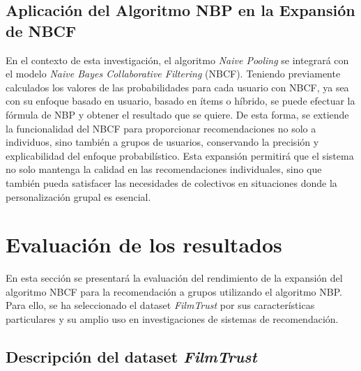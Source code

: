 \documentclass[twocolumn, fontsize=10pt]{article}
\begin{document}
\subsection{Aplicación del Algoritmo NBP en la Expansión de NBCF}

En el contexto de esta investigación, el algoritmo 
\textit{Naive Pooling} se integrará con el modelo 
\textit{Naive Bayes Collaborative Filtering} (NBCF). 
Teniendo previamente calculados los valores de las 
probabilidades para cada usuario con NBCF, ya sea con 
su enfoque basado en usuario, basado en ítems o híbrido,
se puede efectuar la fórmula de NBP y obtener el resultado 
que se quiere. De esta forma, se extiende 
la funcionalidad del NBCF para proporcionar 
recomendaciones no solo a individuos, sino también a 
grupos de usuarios, conservando la precisión y 
explicabilidad del enfoque probabilístico. 
Esta expansión permitirá que el sistema no solo 
mantenga la calidad en las recomendaciones 
individuales, sino que también pueda satisfacer las 
necesidades de colectivos en situaciones donde la 
personalización grupal es esencial.

\section{Evaluación de los resultados}

En esta sección se presentará la evaluación del 
rendimiento de la expansión del algoritmo NBCF para 
la recomendación a grupos utilizando el algoritmo NBP. 
Para ello, se ha seleccionado el dataset \textit{FilmTrust}
 por sus características particulares y su amplio uso 
 en investigaciones de sistemas de recomendación.

 \subsection{Descripción del dataset \textit{FilmTrust}}
\end{document}
